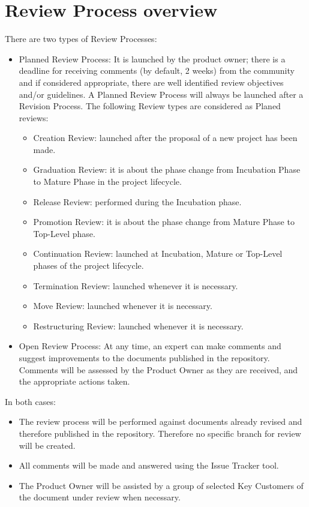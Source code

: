 \documentclass{template/openetcs_article}
\begin{document}
\section{Review Process overview}

There are two types of Review Processes:
\begin{itemize}
\item Planned Review Process: It is launched by the product owner; there is a deadline for receiving comments (by default, 2 weeks) from the community and if considered appropriate, there are well identified review objectives and/or guidelines. A Planned Review Process will always be launched after a Revision Process. 
The following Review types are considered as Planed reviews:
\begin{itemize}
\item Creation Review: launched after the proposal of a new project has been made.
\item Graduation Review: it is about the phase change from Incubation Phase to Mature Phase in the project lifecycle.
\item Release Review: performed during the Incubation phase.
\item Promotion Review: it is about the phase change from Mature Phase to Top-Level phase.
\item Continuation Review: launched at Incubation, Mature or Top-Level phases of the project lifecycle.
\item Termination Review: launched whenever it is necessary.
\item Move Review: launched whenever it is necessary.
\item Restructuring Review: launched whenever it is necessary.
\end{itemize}
\item Open Review Process: At any time, an expert can make comments and suggest improvements to the documents published in the repository. Comments will be assessed by the Product Owner as they are received, and the appropriate actions taken.
\end{itemize}

In both cases:
\begin{itemize}
\item The review process will be performed against documents already revised and therefore published in the repository. Therefore no specific branch for review will be created.
\item All comments will be made and answered using the Issue Tracker tool.
\item The Product Owner will be assisted by a group of selected Key Customers of the document under review when necessary.
\end{itemize}
\end{document}
